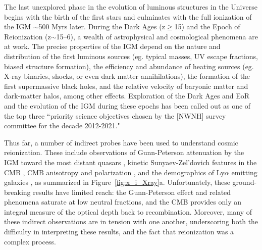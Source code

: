 \documentclass[preprint]{aastex}
\begin{document}
The last unexplored phase in the evolution of luminous structures in the
Universe begins with the birth of the first stars and culminates with the full
ionization of the IGM $\sim$500 Myrs later.  During the Dark Ages
(z$\ge$15) and the Epoch of Reionization (z$\sim$15--6), a wealth of
astrophysical and cosmological phenomena are at work.  The precise properties
of the IGM depend on the nature and distribution of the first luminous sources
(eg. typical masses, UV escape fractions, biased structure formation), the
efficiency and abundance of heating sources (eg.  X-ray binaries, shocks, or
even dark matter annihilations), the formation of the first supermassive black
holes, and the relative velocity of baryonic matter and dark-matter halos,
among other effects.  Exploration of the Dark Ages and EoR and the evolution of
the IGM during these epochs has been called out as one of the top three
``priority science objectives chosen by the [NWNH] survey committee for the
decade 2012-2021."

Thus far, a number of indirect probes have been used to understand cosmic
reionization.  These include observations of Gunn-Peterson attenuation by the
IGM toward the most distant quasars \citep{fan_et_al2006},
kinetic Sunyaev-Zel'dovich features in the CMB \citep{zahn_et_al2012_trunc}, CMB
anisotropy and polarization \citep{page_et_al2007,planck_et_al2013}, and the
demographics of Ly$\alpha$ emitting galaxies
\citep{treu_et_al2013}, as summarized in Figure~\ref{fig:x_i_Xray}a.  Unfortunately,
these ground-breaking results have limited reach: the
Gunn-Peterson effect and related phenomena saturate at low neutral fractions,
and the CMB provides only an integral measure of the optical depth
back to recombination.  Moreover, many of these indirect observations are in
tension with one another, underscoring both the difficulty in interpreting
these results, and the fact that reionization was a complex process.
\end{document}
